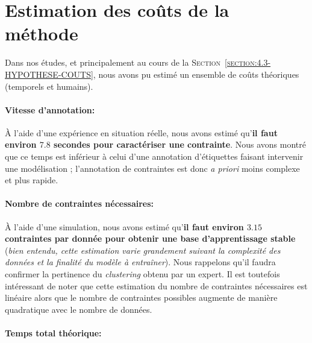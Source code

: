 	
	\newpage
	\section{Estimation des coûts de la méthode}
	\label{section:5.5-GUIDE-COUTS}
	
		Dans nos études, et principalement au cours de la \textsc{Section~\ref{section:4.3-HYPOTHESE-COUTS}}, nous avons pu estimé un ensemble de coûts théoriques (temporels et humains).
		
		
		\paragraph{\textcolor{colorSilverLakeBlue}{\faCheckSquare} Vitesse d'annotation:}
			
			À l'aide d'une expérience en situation réelle, nous avons estimé qu'\textbf{il faut environ $7.8$ secondes pour caractériser une contrainte}.
			Nous avons montré que ce temps est inférieur à celui d'une annotation d'étiquettes faisant intervenir une modélisation ;
			l'annotation de contraintes est donc \textit{a priori} moins complexe et plus rapide.
		
		
		\paragraph{\textcolor{colorSilverLakeBlue}{\faCheckSquare} Nombre de contraintes nécessaires:}
		
			À l'aide d'une simulation, nous avons estimé qu'\textbf{il faut environ $3.15$ contraintes par donnée pour obtenir une base d'apprentissage stable} (\textit{bien entendu, cette estimation varie grandement suivant la complexité des données et la finalité du modèle à entraîner}).
			Nous rappelons qu'il faudra confirmer la pertinence du \textit{clustering} obtenu par un expert.
			Il est toutefois intéressant de noter que cette estimation du nombre de contraintes nécessaires est linéaire alors que le nombre de contraintes possibles augmente de manière quadratique avec le nombre de données.
		
		
		\paragraph{\textcolor{colorSilverLakeBlue}{\faCheckSquare} Temps total théorique:}
		
